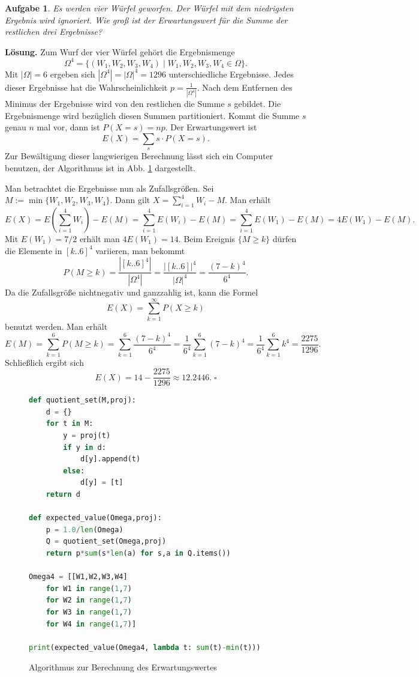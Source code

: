 \documentclass[a4paper,10pt,fleqn,twoside]{scrartcl}
\numberwithin{equation}{section}
\newcommand{\strong}[1]{{\normalfont\sffamily\bfseries #1}}
\renewcommand{\qedsymbol}{\ensuremath{\square}}
\theoremstyle{Aufgabe}
\newtheorem{Aufgabe}{\sffamily Aufgabe}[section]
\begin{document}
\begin{Aufgabe}
Es werden vier Würfel geworfen. Der Würfel mit dem niedrigsten
Ergebnis wird ignoriert. Wie groß ist der Erwartungswert für die
Summe der restlichen drei Ergebnisse?
\end{Aufgabe}
\strong{Lösung.} Zum Wurf der vier Würfel gehört die Ergebnismenge%
\[\Omega^4 = \{(W_1,W_2,W_3,W_4)\mid W_1,W_2,W_3,W_4\in\Omega\}.\]
Mit $|\Omega|=6$ ergeben sich $|\Omega^4|=|\Omega|^4 = 1296$
unterschiedliche Ergebnisse. Jedes dieser Ergebnisse hat die
Wahrscheinlichkeit $p=\frac{1}{|\Omega^4|}$. Nach dem Entfernen
des Minimus der Ergebnisse wird von den restlichen die Summe $s$
gebildet. Die Ergebnismenge wird bezüglich diesen Summen
partitioniert. Kommt die Summe $s$ genau $n$ mal vor, dann
ist $P(X=s)=np$. Der Erwartungswert ist%
\[E(X) = \sum_s s\cdot P(X=s).\]
Zur Bewältigung dieser langwierigen Berechnung lässt sich ein
Computer benutzen, der Algorithmus ist in Abb.
\ref{fig:Algorithmus-Erwartungswert} dargestellt.

Man betrachtet die Ergebnisse nun als Zufallsgrößen. Sei
$M:=\min\{W_1,W_2,W_3,W_4\}$. Dann gilt $X=\sum_{i=1}^4 W_i-M$.
Man erhält
\[E(X) = E(\sum_{i=1}^4 W_i)-E(M) = \sum_{i=1}^4 E(W_i)-E(M)
= \sum_{i=1}^4 E(W_1)-E(M) = 4E(W_1)-E(M).\]
Mit $E(W_1)=7/2$ erhält man $4E(W_1)=14$. Beim Ereignis
$\{M\ge k\}$ dürfen die Elemente in
$[k..6]^4$ variieren, man bekommt%
\[P(M\ge k) = \frac{|[k..6]^4|}{|\Omega^4|}
= \frac{|[k..6]|^4}{|\Omega|^4} = \frac{(7-k)^4}{6^4}.\]
Da die Zufallsgröße nichtnegativ und ganzzahlig ist, kann die Formel%
\[E(X) = \sum_{k=1}^\infty P(X\ge k)\]
benutzt werden. Man erhält
\[E(M) = \sum_{k=1}^6 P(M\ge k) = \sum_{k=1}^6 \frac{(7-k)^4}{6^4}
= \frac{1}{6^4}\sum_{k=1}^6 (7-k)^4 = \frac{1}{6^4}\sum_{k=1}^6 k^4
= \frac{2275}{1296}.\]
Schließlich ergibt sich
\[E(X) = 14-\frac{2275}{1296} \approx 12.2446.\;\qedsymbol\]

\begin{figure}[t]
\begin{lstlisting}[language=Python]
def quotient_set(M,proj):
    d = {}
    for t in M:
        y = proj(t)
        if y in d:
            d[y].append(t)
        else:
            d[y] = [t]
    return d

def expected_value(Omega,proj):
    p = 1.0/len(Omega)
    Q = quotient_set(Omega,proj)
    return p*sum(s*len(a) for s,a in Q.items())

Omega4 = [[W1,W2,W3,W4]
    for W1 in range(1,7)
    for W2 in range(1,7)
    for W3 in range(1,7)
    for W4 in range(1,7)]
    
print(expected_value(Omega4, lambda t: sum(t)-min(t)))
\end{lstlisting}
\caption{Algorithmus zur Berechnung des Erwartungswertes}
\label{fig:Algorithmus-Erwartungswert}
\end{figure}
\end{document}
